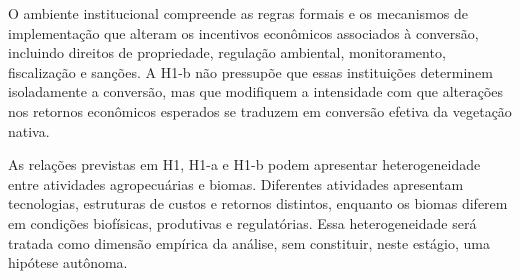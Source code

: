 {O ambiente institucional compreende as regras formais e os mecanismos de implementação que alteram os incentivos econômicos associados à conversão, incluindo direitos de propriedade, regulação ambiental, monitoramento, fiscalização e sanções. A H1-b não pressupõe que essas instituições determinem isoladamente a conversão, mas que modifiquem a intensidade com que alterações nos retornos econômicos esperados se traduzem em conversão efetiva da vegetação nativa.

As relações previstas em H1, H1-a e H1-b podem apresentar heterogeneidade entre atividades agropecuárias e biomas. Diferentes atividades apresentam tecnologias, estruturas de custos e retornos distintos, enquanto os biomas diferem em condições biofísicas, produtivas e regulatórias. Essa heterogeneidade será tratada como dimensão empírica da análise, sem constituir, neste estágio, uma hipótese autônoma.

\medskip




}

